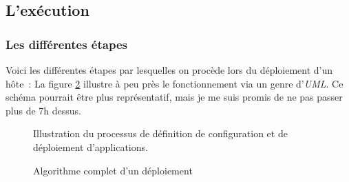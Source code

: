\subsection{L'exécution}

\subsubsection{Les différentes étapes}

Voici les différentes étapes par lesquelles on procède lors du déploiement d'un hôte~:
La figure \ref{1.4_algorithme_complet} illustre à peu près le fonctionnement via un genre d'\emph{UML}.
Ce schéma pourrait être plus représentatif, mais je me suis promis de ne pas passer plus de 7h dessus.

\begin{figure}
	\centerfloat
	\caption{Illustration du processus de définition de configuration et de déploiement d'applications.}
	\label{1.4_definition_runlist}
	
\end{figure}

\begin{figure}
	\centerfloat
	\caption{Algorithme complet d'un déploiement}
	\label{1.4_algorithme_complet}
	
\end{figure}

